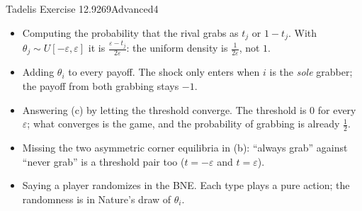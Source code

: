 \begin{exsol}{Tadelis Exercise 12.9}{269}{Advanced}{4}
\mistakes
\begin{itemize}
  \item Computing the probability that the rival grabs as $t_j$ or $1 - t_j$. With $\theta_j \sim
  U[-\varepsilon,\varepsilon]$ it is $\frac{\varepsilon - t_j}{2\varepsilon}$: the uniform density is
  $\frac1{2\varepsilon}$, not $1$.
  \item Adding $\theta_i$ to every payoff. The shock only enters when $i$ is the \emph{sole} grabber; the
  payoff from both grabbing stays $-1$.
  \item Answering (c) by letting the threshold converge. The threshold is $0$ for every $\varepsilon$; what
  converges is the game, and the probability of grabbing is already $\frac12$.
  \item Missing the two asymmetric corner equilibria in (b): ``always grab'' against ``never grab'' is a
  threshold pair too ($t = -\varepsilon$ and $t = \varepsilon$).
  \item Saying a player randomizes in the BNE. Each type plays a pure action; the randomness is in
  Nature's draw of $\theta_i$.
\end{itemize}

\end{exsol}
